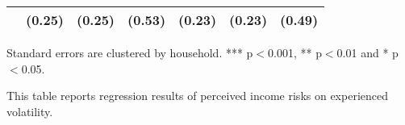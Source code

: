 \begin{table}[p]
\begin{adjustbox}{width=\textwidth}
\begin{threeparttable}
\begin{tabular}{lllllll}
                 &    (0.25) &    (0.25) &     (0.53) &    (0.23) &     (0.23) &      (0.49) \\
\bottomrule
\end{tabular}
\begin{tablenotes}\item Standard errors are clustered by household. *** p$<$0.001, ** p$<$0.01 and * p$<$0.05. 
\item This table reports regression results of perceived income risks on experienced volatility.
\end{tablenotes}
\end{threeparttable}
\end{adjustbox}
\end{table}